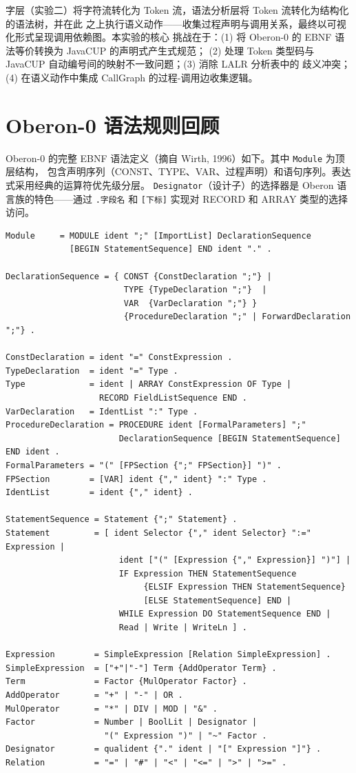 \documentclass[a4paper]{article}
\begin{document}
字层（实验二）将字符流转化为 Token 流，语法分析层将 Token 流转化为结构化的语法树，并在此
之上执行语义动作——收集过程声明与调用关系，最终以可视化形式呈现调用依赖图。本实验的核心
挑战在于：(1) 将 Oberon-0 的 EBNF 语法等价转换为 JavaCUP 的声明式产生式规范；
(2) 处理 Token 类型码与 JavaCUP 自动编号间的映射不一致问题；(3) 消除 LALR 分析表中的
歧义冲突；(4) 在语义动作中集成 CallGraph 的过程-调用边收集逻辑。

\section{Oberon-0 语法规则回顾}

Oberon-0 的完整 EBNF 语法定义（摘自 Wirth, 1996）如下。其中 \texttt{Module} 为顶层结构，
包含声明序列（CONST、TYPE、VAR、过程声明）和语句序列。表达式采用经典的运算符优先级分层。
\texttt{Designator}（设计子）的选择器是 Oberon 语言族的特色——通过 \texttt{.字段名} 和
\texttt{[下标]} 实现对 RECORD 和 ARRAY 类型的选择访问。

{\small
\begin{verbatim}
Module     = MODULE ident ";" [ImportList] DeclarationSequence
             [BEGIN StatementSequence] END ident "." .

DeclarationSequence = { CONST {ConstDeclaration ";"} |
                        TYPE {TypeDeclaration ";"}  |
                        VAR  {VarDeclaration ";"} }
                        {ProcedureDeclaration ";" | ForwardDeclaration ";"} .

ConstDeclaration = ident "=" ConstExpression .
TypeDeclaration  = ident "=" Type .
Type             = ident | ARRAY ConstExpression OF Type |
                   RECORD FieldListSequence END .
VarDeclaration   = IdentList ":" Type .
ProcedureDeclaration = PROCEDURE ident [FormalParameters] ";"
                       DeclarationSequence [BEGIN StatementSequence] END ident .
FormalParameters = "(" [FPSection {";" FPSection}] ")" .
FPSection        = [VAR] ident {"," ident} ":" Type .
IdentList        = ident {"," ident} .

StatementSequence = Statement {";" Statement} .
Statement         = [ ident Selector {"," ident Selector} ":=" Expression |
                       ident ["(" [Expression {"," Expression}] ")"] |
                       IF Expression THEN StatementSequence
                            {ELSIF Expression THEN StatementSequence}
                            [ELSE StatementSequence] END |
                       WHILE Expression DO StatementSequence END |
                       Read | Write | WriteLn ] .

Expression        = SimpleExpression [Relation SimpleExpression] .
SimpleExpression  = ["+"|"-"] Term {AddOperator Term} .
Term              = Factor {MulOperator Factor} .
AddOperator       = "+" | "-" | OR .
MulOperator       = "*" | DIV | MOD | "&" .
Factor            = Number | BoolLit | Designator |
                    "(" Expression ")" | "~" Factor .
Designator        = qualident {"." ident | "[" Expression "]"} .
Relation          = "=" | "#" | "<" | "<=" | ">" | ">=" .
\end{verbatim}
}
\end{document}
